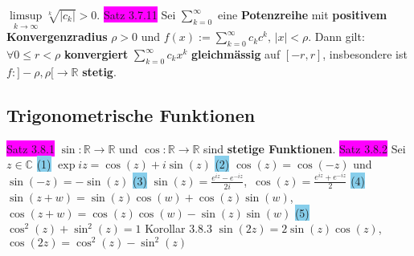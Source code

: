 \documentclass[landscape, 10pt]{article}
\newcommand{\R}{\mathbb{R}}
\newcommand{\C}{\mathbb{C}}
\begin{document}
\begin{multicols}{3}
                     \textcolor{NavyBlue}{$\limsup\limits_{k\to\infty}\sqrt[k]{|c_k|}>0$}.
              \colorbox{magenta}{Satz 3.7.11} Sei \textcolor{NavyBlue}{$\sum_{k=0}^\infty$}
                     eine \textbf{Potenzreihe} mit 
                     \textbf{positivem Konvergenzradius} 
                     \textcolor{NavyBlue}{$\rho>0$} und  
                     \textcolor{NavyBlue}{$f(x):=\sum_{k=0}^\infty c_kc^k,\,|x|<\rho$}. 
                     Dann gilt: \textcolor{NavyBlue}{$\forall0\leqslant r<\rho$} 
                     \textbf{konvergiert} 
                     \textcolor{NavyBlue}{$\sum_{k=0}^\infty c_kx^k$} 
                     \textbf{gleichmässig} auf \textcolor{NavyBlue}{$[-r,r]$}, insbesondere 
                     ist \textcolor{NavyBlue}{$f:]-\rho,\rho[\longrightarrow\R$} 
                     \textbf{stetig}.
       \subsection{Trigonometrische Funktionen}
              \colorbox{magenta}{Satz 3.8.1} \textcolor{NavyBlue}{$\sin:\R\longrightarrow\R$} 
                     und 
                     \textcolor{NavyBlue}{$\cos:\R\longrightarrow\R$} 
                     sind \textbf{stetige Funktionen}.
              \colorbox{magenta}{Satz 3.8.2} Sei \textcolor{NavyBlue}{$z\in\C$}
                     \colorbox{SkyBlue}{(1)} \textcolor{NavyBlue}{$\exp iz=\cos(z)+i\sin(z)$} 
                     \colorbox{SkyBlue}{(2)} \textcolor{NavyBlue}{$\cos(z)=\cos(-z)$} und 
                     \textcolor{NavyBlue}{$\sin(-z)=-\sin(z)$}
                     \colorbox{SkyBlue}{(3)} 
                     \textcolor{NavyBlue}{$\sin(z)=\frac{e^{iz}-e^{-iz}}{2i}$},\,
                     \textcolor{NavyBlue}{$\cos(z)=\frac{e^{iz}+e^{-iz}}{2}$} 
                     \colorbox{SkyBlue}{(4)} 
                     \textcolor{NavyBlue}{$\sin(z+w)=\sin(z)\cos(w)+\cos(z)\sin(w)$},\,
                     \textcolor{NavyBlue}{$\cos(z+w)=\cos(z)\cos(w)-\sin(z)\sin(w)$} 
                     \colorbox{SkyBlue}{(5)} \textcolor{NavyBlue}{$\cos^2(z)+\sin^2(z)=1$}
              \colorbox{BurntOrange}{Korollar 3.8.3} 
                     \textcolor{NavyBlue}{$\sin(2z)=2\sin(z)\cos(z)$},\,
                     \textcolor{NavyBlue}{$\cos(2z)=\cos^2(z)-\sin^2(z)$}

\end{multicols}
\end{document}
